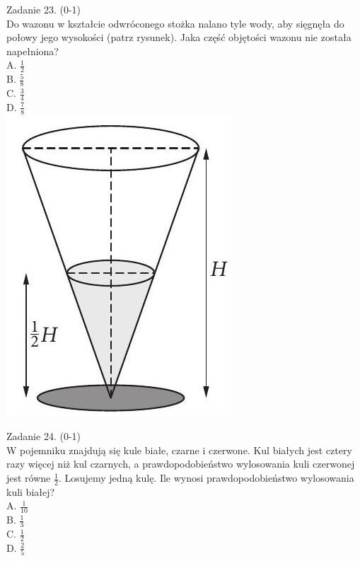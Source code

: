 \documentclass[10pt]{article}
\begin{document}
Zadanie 23. (0-1)\\
Do wazonu w kształcie odwróconego stożka nalano tyle wody, aby sięgnęła do połowy jego wysokości (patrz rysunek). Jaka część objętości wazonu nie została napełniona?\\
A. \(\frac{1}{2}\)\\
B. \(\frac{5}{8}\)\\
C. \(\frac{3}{4}\)\\
D. \(\frac{7}{8}\)\\
\includegraphics[max width=\textwidth, center]{2024_11_21_1e89351873aa60c4c1b9g-08(1)}

Zadanie 24. (0-1)\\
W pojemniku znajdują się kule białe, czarne i czerwone. Kul białych jest cztery razy więcej niż kul czarnych, a prawdopodobieństwo wylosowania kuli czerwonej jest równe \(\frac{1}{2}\). Losujemy jedną kulę. Ile wynosi prawdopodobieństwo wylosowania kuli białej?\\
A. \(\frac{1}{10}\)\\
B. \(\frac{1}{3}\)\\
C. \(\frac{1}{2}\)\\
D. \(\frac{2}{5}\)
\end{document}
